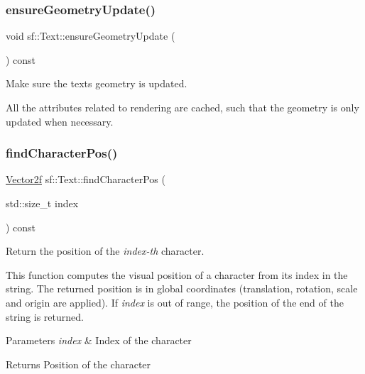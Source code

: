 \subsubsection{\texorpdfstring{ensureGeometryUpdate()}{ensureGeometryUpdate()}}
{\footnotesize\ttfamily void sf\+::\+Text\+::ensure\+Geometry\+Update (\begin{DoxyParamCaption}{ }\end{DoxyParamCaption}) const\hspace{0.3cm}{\ttfamily [private]}}



Make sure the text\textquotesingle{}s geometry is updated. 

All the attributes related to rendering are cached, such that the geometry is only updated when necessary. \begin{DoxyVerb}\end{DoxyVerb}
 \mbox{\label{classsf_1_1_text_a2e252d8dcae3eb61c6c962c0bc674b12}} 
\subsubsection{\texorpdfstring{findCharacterPos()}{findCharacterPos()}}
{\footnotesize\ttfamily \mbox{\hyperlink{classsf_1_1_vector2}{Vector2f}} sf\+::\+Text\+::find\+Character\+Pos (\begin{DoxyParamCaption}\item[{std\+::size\+\_\+t}]{index }\end{DoxyParamCaption}) const}



Return the position of the {\itshape index-\/th} character. 

This function computes the visual position of a character from its index in the string. The returned position is in global coordinates (translation, rotation, scale and origin are applied). If {\itshape index} is out of range, the position of the end of the string is returned.


\begin{DoxyParams}{Parameters}
{\em index} & Index of the character\\
\hline
\end{DoxyParams}
\begin{DoxyReturn}{Returns}
Position of the character \begin{DoxyVerb}\end{DoxyVerb}
 
\end{DoxyReturn}
\mbox{\label{classsf_1_1_text_a46d1d7f1d513bb8d434e985a93ea5224}} 
